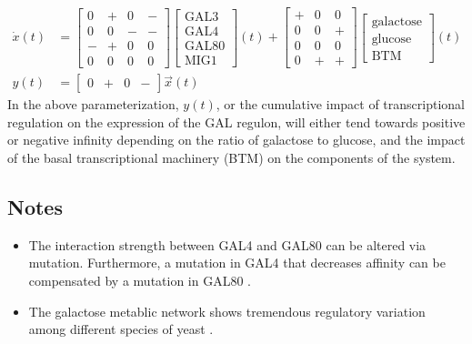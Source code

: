 \documentclass[11 pt]{article}
\begin{document}
    \begin{align*}
      \dot{x}(t) &= \begin{bmatrix} 0 & + & 0 & - \\ 0 & 0 & - & - \\ - & + & 0 & 0 \\ 0 & 0 & 0 & 0 \end{bmatrix} \begin{bmatrix} \text{GAL3} \\ \text{GAL4} \\ \text{GAL80} \\ \text{MIG1} \end{bmatrix}(t) + \begin{bmatrix} + & 0 & 0 \\ 0 & 0 & + \\ 0 & 0 & 0 \\ 0 & + & + \end{bmatrix} \begin{bmatrix} \text{galactose} \\ \text{glucose} \\ \text{BTM} \end{bmatrix}(t) \\
        y(t) &= \begin{bmatrix} 0 & + & 0 & - \end{bmatrix} \vec{x}(t)
    \end{align*}
    In the above parameterization, $y(t)$, or the cumulative impact of transcriptional regulation on the expression of the GAL regulon, will either tend towards positive or negative infinity depending on the ratio of galactose to glucose, and the impact of the basal transcriptional machinery (BTM) on the components of the system.
    
    \subsection{Notes}
    \begin{itemize}
      \item The interaction strength between GAL4 and GAL80 can be altered via mutation. Furthermore, a mutation in GAL4 that decreases affinity can be compensated by a mutation in GAL80 \citep{li2010alterations, salmeron1990gal4, adhikari2014perturbation}.
      \item The galactose metablic network shows tremendous regulatory variation among different species of yeast \citep{lavoie2009rearrangements, martchenko2007transcriptional, dalal2016transcriptional}.
    \end{itemize}




\end{document}

